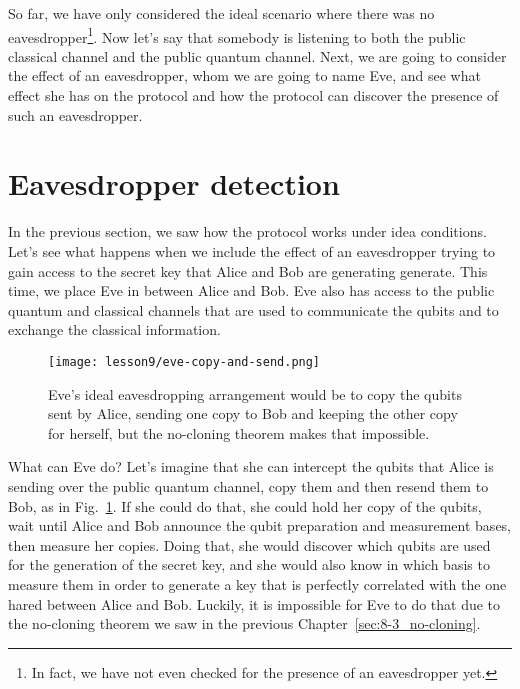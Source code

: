 So far, we have only considered the ideal scenario where there was no eavesdropper\footnote{In fact, we have not even checked for the presence of an eavesdropper yet.}.
Now let's say that somebody is listening to both the public classical channel and the public quantum channel.
Next, we are going to consider the effect of an eavesdropper, whom we are going to name Eve, and see what effect she has on the protocol and how the protocol can discover the presence of such an eavesdropper.



\section{Eavesdropper detection}
\label{sec:eavesdropper-detection}

In the previous section, we saw how the protocol works under idea conditions.
Let's see what happens when we include the effect of an eavesdropper trying to gain access to the secret key that Alice and Bob are generating generate.
This time, we place Eve in between Alice and Bob.
Eve also has access to the public quantum and classical channels that are used to communicate the qubits and to exchange the classical information.

\begin{figure}[t]
    \centering
    \texttt{[image: lesson9/eve-copy-and-send.png]}
        \caption[Eve's ideal (but impossible) eavesdropping arrangement.]{Eve's ideal eavesdropping arrangement would be to copy the qubits sent by Alice, sending one copy to Bob and keeping the other copy for herself, but the no-cloning theorem makes that impossible.}
    \label{fig:eve-copy-and-send}
\end{figure}

What can Eve do?
Let's imagine that she can intercept the qubits that Alice is sending over the public quantum channel, copy them and then resend them to Bob, as in Fig.~\ref{fig:eve-copy-and-send}.
If she could do that, she could hold her copy of the qubits, wait until Alice and Bob announce the qubit preparation and measurement bases, then measure her copies.
Doing that, she would discover which qubits are used for the generation of the secret key, and she would also know in which basis to measure them in order to generate a key that is perfectly correlated with the one hared between Alice and Bob.
Luckily, it is impossible for Eve to do that due to the no-cloning theorem we saw in the previous Chapter~\ref{sec:8-3_no-cloning}.

